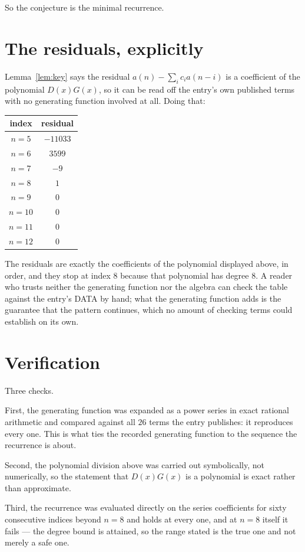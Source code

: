 \documentclass[11pt,a4paper]{article}
\theoremstyle{plain}
\theoremstyle{definition}
\begin{document}
So the conjecture is the minimal recurrence.

\section{The residuals, explicitly}

Lemma~\ref{lem:key} says the residual $a(n)-\sum_ic_ia(n-i)$ is a coefficient of the
polynomial $D(x)G(x)$, so it can be read off the entry's own published terms with no
generating function involved at all. Doing that:
\begin{center}
\begin{tabular}{cc}
index & residual \\ \hline
$n=5$ & $-11033$ \\
$n=6$ & $3599$ \\
$n=7$ & $-9$ \\
$n=8$ & $1$ \\
$n=9$ & $0$ \\
$n=10$ & $0$ \\
$n=11$ & $0$ \\
$n=12$ & $0$
\end{tabular}
\end{center}
The residuals are exactly the coefficients of the polynomial displayed above, in order, and
they stop at index $8$ because that polynomial has degree $8$. A reader who trusts
neither the generating function nor the algebra can check the table against the entry's DATA
by hand; what the generating function adds is the guarantee that the pattern continues, which
no amount of checking terms could establish on its own.

\section{Verification}

Three checks.

First, the generating function was expanded as a power series in exact rational arithmetic and
compared against all $26$ terms the entry publishes: it reproduces every one. This is
what ties the recorded generating function to the sequence the recurrence is about.

Second, the polynomial division above was carried out symbolically, not numerically, so the
statement that $D(x)G(x)$ is a polynomial is exact rather than approximate.

Third, the recurrence was evaluated directly on the series coefficients for sixty consecutive
indices beyond $n=8$ and holds at every one, and at $n=8$ itself it fails --- the
degree bound is attained, so the range stated is the true one and not merely a safe one.
\end{document}
